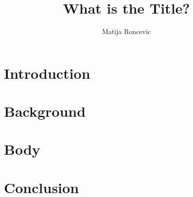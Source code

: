 \documentclass[sigconf]{acmart}
\title{What is the Title?}
\author{Matija Roncevic}
\affiliation{
    \institution{Friedricht-Alexander-Universität Erlangen-Nürnberg}
    \country{}}
\begin{document}
\maketitle  %

\thispagestyle{plain} %
\pagestyle{plain} %



\section{Introduction}


\section{Background}


\section{Body}


\section{Conclusion}

\end{document}
